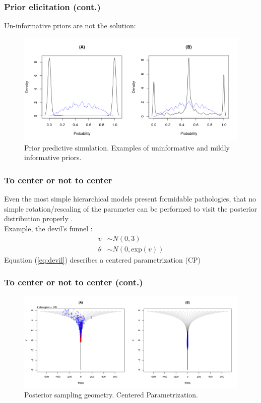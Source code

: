 \documentclass[nonav,sleutel]{beamer}
\begin{document}
	\begin{frame}
		\frametitle{Prior elicitation (cont.)}
		Un-informative priors are not the solution:
		\begin{figure}[!h]
			\centering
			\includegraphics[width=1\textwidth]{prior_elicitation}
			\caption{Prior predictive simulation. Examples of uninformative and mildly informative priors.}
			\label{fig:prior_elicitation}
		\end{figure}
	\end{frame}
	\begin{frame}
		\frametitle{To center or not to center}
		Even the most simple hierarchical models present formidable pathologies, that no simple rotation/rescaling of the parameter can be performed to visit the posterior distribution properly \cite{Betancourt_et_al_2013}. \\
		\vspace{0.3cm} Example, the devil's funnel \cite{McElreath_2020}:
		\begin{equation} \label{eq:devil}
			\begin{split}	
				v &\sim N(0, 3) \\
				\theta &\sim N(0, \text{exp}(v))
			\end{split}
		\end{equation}
		Equation (\ref{eq:devil}) describes a centered parametrization (CP)
	\end{frame}
	\begin{frame}
		\frametitle{To center or not to center (cont.)}
		\begin{figure}[h]
			\centering
			\includegraphics[width=1\linewidth]{1_funnel_CE_simple}
			\caption{Posterior sampling geometry. Centered Parametrization.}
			\label{fig:devil_CE_geom}
		\end{figure}
	\end{frame}
\end{document}
